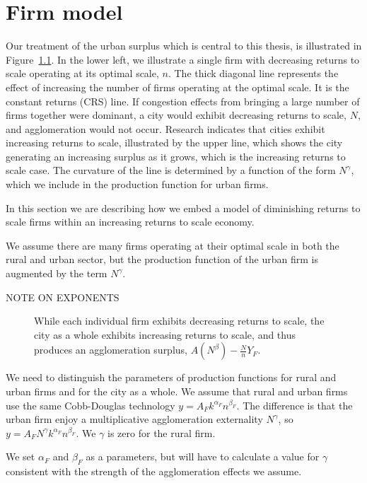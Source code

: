 
\chapter{Firm model}
Our treatment of the urban surplus which is central to this thesis, is illustrated in Figure~\ref{fig:Agglomeration-surplus}. In the lower left, we illustrate a single firm with decreasing returns to scale operating at its optimal scale, $n$. The thick diagonal line represents the effect of increasing the number of firms operating at the optimal scale. It is the constant returns (CRS) line. If congestion effects from bringing a large number of firms together were dominant, a city would exhibit decreasing returns to  scale,  $N$, and agglomeration would not occur. Research indicates that cities exhibit increasing returns to scale, illustrated by the upper line, which shows the city generating an increasing surplus as it grows, which is the increasing returns to scale case. The curvature of the line is determined by a function of the form $N^\gamma$, which we include in the production function for urban firms. 

In this section we are describing how we embed a model of diminishing returns to scale firms within an increasing returns to scale economy. 

We assume there are many firms operating at their optimal scale in both the rural and urban sector, but the production function of the urban firm is augmented by the term $N^\gamma$. 

NOTE ON EXPONENTS

\begin{figure}[htb]
    \centering

    \caption{While each individual firm exhibits decreasing returns to scale, the city as a whole exhibits increasing returns to scale, and thus produces an agglomeration surplus, $A(N^\beta)-\frac{N}{n}Y_F$.}
    \label{fig:Agglomeration-surplus}
\end{figure}

We need to distinguish the parameters of production functions for rural and urban firms and for the city as a whole. We assume that  rural and  urban firms use the same Cobb-Douglas technology ${y}=A_Fk^{\alpha_F}n^{\beta_F}$. The difference is that the urban firm enjoy a  multiplicative agglomeration externality $N^\gamma$, so ${y}=A_FN^\gamma  k^{\alpha_F}n^{\beta_F}$. We  $\gamma$ is zero for the rural firm.

We set $\alpha_F$ and $\beta_F$ as a parameters, but will have to calculate a value for $\gamma$ consistent with the strength of the agglomeration effects we assume. 


